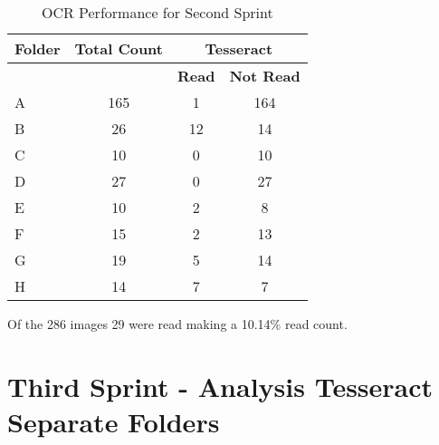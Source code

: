 \begin{table}[h]
    \centering
    \caption{OCR Performance for Second Sprint}
    \label{tab:second_print}
    \begin{tabular}{|l|c|c|c|}
        \hline
        \textbf{Folder} & \textbf{Total Count} & \multicolumn{2}{c|}{\textbf{Tesseract}}                     \\
        \hline
                        &                      & \textbf{Read}                           & \textbf{Not Read} \\
        \hline
        A               & 165                  & 1                                       & 164               \\
        B               & 26                   & 12                                      & 14                \\
        C               & 10                   & 0                                       & 10                \\
        D               & 27                   & 0                                       & 27                \\
        E               & 10                   & 2                                       & 8                 \\
        F               & 15                   & 2                                       & 13                \\
        G               & 19                   & 5                                       & 14                \\
        H               & 14                   & 7                                       & 7                 \\
        \hline
    \end{tabular}
\end{table}

Of the 286 images 29 were read making a 10.14\% read count.


\newpage

\section{Third Sprint - Analysis Tesseract Separate Folders}

